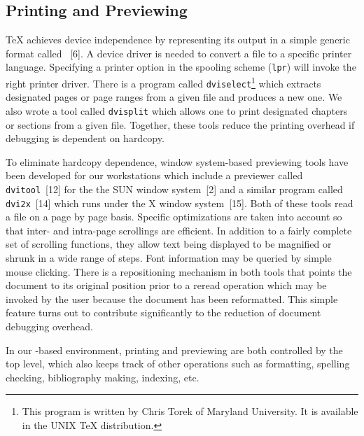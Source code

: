\subsection{Printing and Previewing}
{\TeX} achieves device independence by representing its output
in a simple generic format called {\dvi}~[6].
A device driver is needed to convert a {\dvi} file to a specific printer
language.
Specifying a printer option in the {\unix} spooling scheme (\verb|lpr|)
will invoke the right printer driver.  
There is a program called \verb|dviselect|\footnote{This program
is written by Chris Torek of Maryland University.  It is available
in the UNIX {\TeX} distribution.} which extracts designated pages or
page ranges from
a given {\dvi} file and produces a new one.  We also wrote a tool
called \verb|dvisplit| which allows one to print designated chapters or sections
from a given {\dvi} file.  Together, these tools reduce the printing overhead
if debugging is dependent on hardcopy.

To eliminate hardcopy dependence, window system-based previewing tools
have been developed for our workstations which include a
{\dvi} previewer called \verb|dvitool|~[12] for the
the SUN window system~[2] and a similar program called
\verb|dvi2x|~[14] which runs
under the X window system~[15].
Both of these tools read a {\dvi} file on a page by page basis.
Specific optimizations are taken into account
so that inter- and intra-page scrollings are efficient.
In addition to a fairly complete set of scrolling functions, they allow
text being displayed to be magnified or shrunk in a wide range of steps.
Font information may be queried by simple mouse clicking.
There is a repositioning mechanism in both tools that points the document
to its original position prior to a reread operation which may be invoked
by the user because the document has been reformatted.
This simple feature turns out to contribute significantly to the
reduction of document debugging overhead.

In our {\emacs}-based environment, printing and previewing
are both controlled by the {\TM} top level, which also keeps track of
other operations such as formatting, spelling checking, bibliography making,
indexing, etc.


